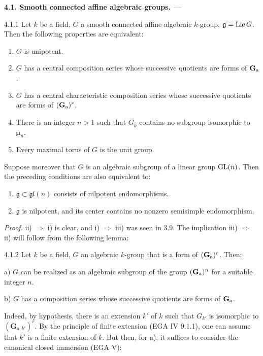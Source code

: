\par\medskip\noindent\textbf{4.1. Smooth connected affine algebraic groups.}\ ---\par\label{XVII.4.1}
\begin{proposition}{4.1.1}\label{XVII.4.1.1}
Let $k$ be a field, $G$ a smooth connected affine algebraic $k$-group, $\mathfrak g=\operatorname{Lie} G$. Then the following properties are equivalent:
\begin{enumerate}[label=\textup{\roman*)}]
\item $G$ is unipotent.
\item $G$ has a central composition series whose successive quotients are forms of $\mathbf{G}_{\mathrm{a}}$.
\item $G$ has a central characteristic composition series whose successive quotients are forms of $(\mathbf{G}_{\mathrm{a}})^r$.
\item There is an integer $n>1$ such that $G_{\overline k}$ contains no subgroup isomorphic to $\boldsymbol\mu_n$.
\item Every maximal torus of $G$ is the unit group.
\end{enumerate}
Suppose moreover that $G$ is an algebraic subgroup of a linear group $\operatorname{GL}(n)$. Then the preceding conditions are also equivalent to:
\begin{enumerate}[label=\textup{\roman*)},start=6]
\item $\mathfrak g\subset\mathfrak{gl}(n)$ consists of nilpotent endomorphisms.
\item $\mathfrak g$ is nilpotent, and its center contains no nonzero semisimple endomorphism.
\end{enumerate}
\end{proposition}
\noindent\emph{Proof.} ii) $\Rightarrow$ i) is clear, and i) $\Rightarrow$ iii) was seen in 3.9. The implication iii) $\Rightarrow$ ii) will follow from the following lemma:
\begin{lemma}{4.1.2}\label{XVII.4.1.2}
Let $k$ be a field, $G$ an algebraic $k$-group that is a form of $(\mathbf{G}_{\mathrm{a}})^r$. Then:

\noindent a) $G$ can be realized as an algebraic subgroup of the group $(\mathbf{G}_{\mathrm{a}})^n$ for a suitable integer $n$.

\noindent b) $G$ has a composition series whose successive quotients are forms of $\mathbf{G}_{\mathrm{a}}$.
\end{lemma}
Indeed, by hypothesis, there is an extension $k'$ of $k$ such that $G_{k'}$ is isomorphic to $(\mathbf G_{\mathrm a,k'})^r$. By the principle of finite extension (EGA IV 9.1.1), one can assume that $k'$ is a finite extension of $k$. But then, for a), it suffices to consider the canonical closed immersion (EGA V):
